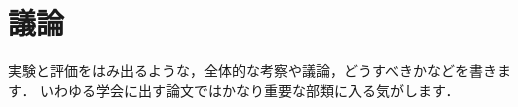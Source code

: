 
\chapter{議論}
\label{sec:discussion}


実験と評価をはみ出るような，全体的な考察や議論，どうすべきかなどを書きます．
いわゆる学会に出す論文ではかなり重要な部類に入る気がします．